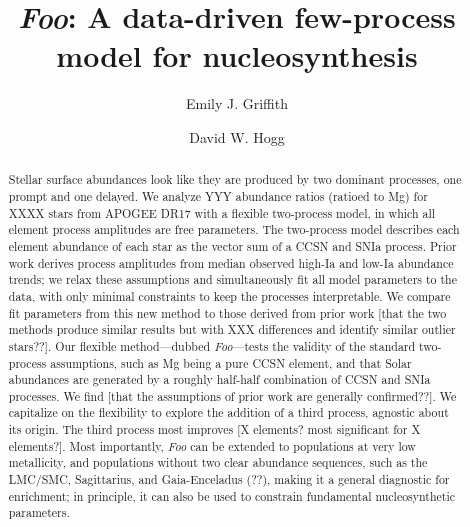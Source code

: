 \documentclass[modern]{aastex631}
\newcommand{\name}{\textsl{Foo}} %
\begin{document}
\title{\name: A data-driven few-process model for nucleosynthesis}


\author[0000-0001-9345-9977]{Emily J. Griffith}

\author[0000-0003-2866-9403]{David W. Hogg}


\begin{abstract}\noindent %
Stellar surface abundances look like they are produced by two dominant processes, one prompt and one delayed.
We analyze YYY abundance ratios (ratioed to Mg) for XXXX stars from APOGEE DR17 with a flexible two-process model, in which all element process amplitudes are free parameters.
The two-process model describes each element abundance of each star as the vector sum of a CCSN and SNIa process.
Prior work derives process amplitudes from median observed high-Ia and low-Ia abundance trends; we relax these assumptions and simultaneously fit all model parameters to the data, with only minimal constraints to keep the processes interpretable.
We compare fit parameters from this new method to those derived from prior work [that the two methods produce similar results but with XXX differences and identify similar outlier stars??].
Our flexible method---dubbed \name---tests the validity of the standard two-process assumptions, such as Mg being a pure CCSN element, and that Solar abundances are generated by a roughly half-half combination of CCSN and SNIa processes.
We find [that the assumptions of prior work are generally confirmed??].
We capitalize on the flexibility to explore the addition of a third process, agnostic about its origin.
The third process most improves [X elements? most significant for X elements?].
Most importantly, \name{} can be extended to populations at very low metallicity, and populations without two clear abundance sequences, such as the LMC/SMC, Sagittarius, and Gaia-Enceladus (??), making it a general diagnostic for enrichment; in principle, it can also be used to constrain fundamental nucleosynthetic parameters.
\end{abstract}
\end{document}
